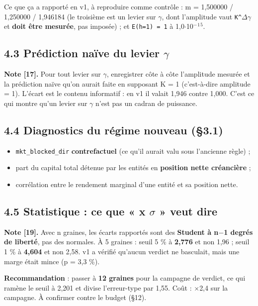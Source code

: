 \documentclass[11pt,a4paper]{article}
\newcommand{\code}[1]{\texttt{#1}}
\begin{document}
Ce que ça a rapporté en v1, à reproduire comme contrôle : m = 1,500000 / 1,250000 / 1,946184 (le troisième est un levier sur \ensuremath{\gamma}, dont l'amplitude vaut \code{K\textasciicircum{}\ensuremath{\Delta}\ensuremath{\gamma}} et \textbf{doit être mesurée}, pas imposée) ; et \code{E(h=1) = 1} à 1,0\ensuremath{\cdot}10\ensuremath{^-}\ensuremath{^1}\ensuremath{^5}.

\subsection*{4.3 Prédiction naïve du levier \ensuremath{\gamma}}

\textbf{Note [17].} Pour tout levier sur \ensuremath{\gamma}, enregistrer côte à côte l'amplitude mesurée et la prédiction naïve qu'on aurait faite en supposant K = 1 (c'est-à-dire amplitude = 1). L'écart est le contenu informatif : en v1 il valait 1,946 contre 1,000. C'est ce qui montre qu'un levier sur \ensuremath{\gamma} n'est pas un cadran de puissance.

\subsection*{4.4 Diagnostics du régime nouveau (§3.1)}

\begin{itemize}
\item \code{mkt\_blocked\_dir} \textbf{contrefactuel} (ce qu'il aurait valu sous l'ancienne règle) ;
\item part du capital total détenue par les entités en \textbf{position nette créancière} ;
\item corrélation entre le rendement marginal d'une entité et sa position nette.
\end{itemize}

\subsection*{4.5 Statistique : ce que « x \ensuremath{\sigma} » veut dire}

\textbf{Note [19].} Avec n graines, les écarts rapportés sont des \textbf{Student à n\ensuremath{-}1 degrés de liberté}, pas des normales. À 5 graines : seuil 5 \% à \textbf{2,776} et non 1,96 ; seuil 1 \% à \textbf{4,604} et non 2,58. v1 a vérifié qu'aucun verdict ne basculait, mais une marge était mince (p = 3,3 \%).

\textbf{Recommandation} : passer à \textbf{12 graines} pour la campagne de verdict, ce qui ramène le seuil à 2,201 et divise l'erreur-type par 1,55. Coût : \ensuremath{\times}2,4 sur la campagne. À confirmer contre le budget (§12).
\end{document}
